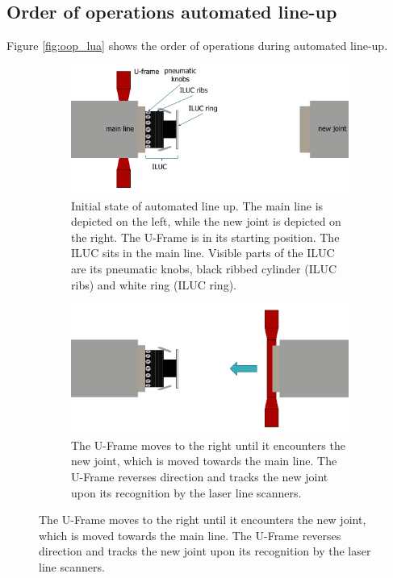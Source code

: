 \subsection{Order of operations automated line-up} \label{ssec:oop_lua}
Figure \ref{fig:oop_lua} shows the order of operations during automated line-up.
\begin{figure}[H]
    \centering
    \begin{subfigure}{0.7\textwidth}
        \includegraphics[width=\textwidth ]{images/lua_oop_intro.png}
        \caption{Initial state of automated line up. The main line is depicted on the left,
            while the new joint is depicted on the right. The U-Frame is in its starting position. The ILUC
            sits in the main line. Visible parts of the ILUC are its pneumatic knobs, black ribbed cylinder (ILUC ribs)
            and white ring (ILUC ring).}
        \label{fig:oop_intro}
    \end{subfigure}
    \begin{subfigure}{0.7\textwidth}
        \includegraphics[width=\textwidth ]{images/lua_oop_track_new_joint.png}
        \caption{The U-Frame moves to the right until it encounters the new joint, which is moved towards the main line.
            The U-Frame reverses direction and tracks the new joint upon its recognition by the laser line scanners.}
        \label{fig:oop_track}

\end{subfigure}
\end{figure}
